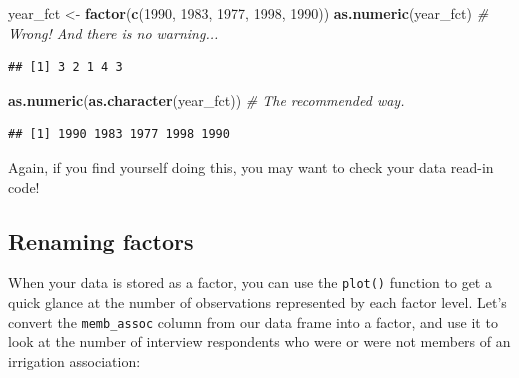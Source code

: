 \documentclass[]{book}
\newenvironment{Shaded}{\begin{snugshade}}{\end{snugshade}}
\newcommand{\KeywordTok}[1]{\textcolor[rgb]{0.13,0.29,0.53}{\textbf{#1}}}
\newcommand{\DataTypeTok}[1]{\textcolor[rgb]{0.13,0.29,0.53}{#1}}
\newcommand{\DecValTok}[1]{\textcolor[rgb]{0.00,0.00,0.81}{#1}}
\newcommand{\StringTok}[1]{\textcolor[rgb]{0.31,0.60,0.02}{#1}}
\newcommand{\CommentTok}[1]{\textcolor[rgb]{0.56,0.35,0.01}{\textit{#1}}}
\newcommand{\OperatorTok}[1]{\textcolor[rgb]{0.81,0.36,0.00}{\textbf{#1}}}
\newcommand{\NormalTok}[1]{#1}
\begin{document}
\begin{Shaded}
\begin{Highlighting}[]
\NormalTok{year_fct <-}\StringTok{ }\KeywordTok{factor}\NormalTok{(}\KeywordTok{c}\NormalTok{(}\DecValTok{1990}\NormalTok{, }\DecValTok{1983}\NormalTok{, }\DecValTok{1977}\NormalTok{, }\DecValTok{1998}\NormalTok{, }\DecValTok{1990}\NormalTok{))}
\KeywordTok{as.numeric}\NormalTok{(year_fct)                     }\CommentTok{# Wrong! And there is no warning...}
\end{Highlighting}
\end{Shaded}

\begin{verbatim}
## [1] 3 2 1 4 3
\end{verbatim}

\begin{Shaded}
\begin{Highlighting}[]
\KeywordTok{as.numeric}\NormalTok{(}\KeywordTok{as.character}\NormalTok{(year_fct))       }\CommentTok{# The recommended way.}
\end{Highlighting}
\end{Shaded}

\begin{verbatim}
## [1] 1990 1983 1977 1998 1990
\end{verbatim}

Again, if you find yourself doing this, you may want to check your data
read-in code!

\subsection{Renaming factors}\label{renaming-factors}

When your data is stored as a factor, you can use the \texttt{plot()}
function to get a quick glance at the number of observations represented
by each factor level. Let's convert the \texttt{memb\_assoc} column from
our data frame into a factor, and use it to look at the number of
interview respondents who were or were not members of an irrigation
association:

\begin{Shaded}
\end{Shaded}
\end{document}
